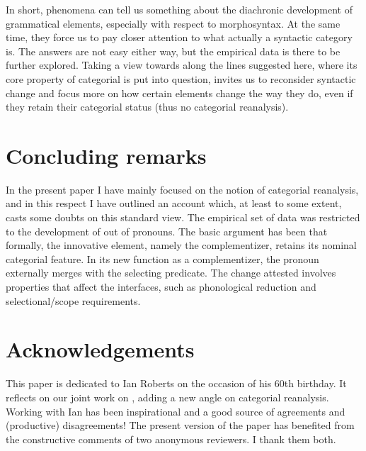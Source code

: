 \documentclass[output=paper]{langsci/langscibook}
\begin{document}
In short,  phenomena can tell us something about the
diachronic development of grammatical elements, especially with respect to
morphosyntax. At the same time, they force us to pay closer attention to what
actually a syntactic category is. The answers are not easy either way, but the
empirical data is there to be further explored. Taking a view towards
 along the lines suggested here, where its core property of
categorial  is put into question, invites us to reconsider syntactic
change and focus more on how certain elements change the way they do, even if
they retain their categorial status (thus no categorial reanalysis).

\section{Concluding remarks}\label{sec:21-conclusions}

In the present paper I have mainly focused on the notion of categorial
reanalysis, and in this respect I have outlined an account which, at least to
some extent, casts some doubts on this standard view. The empirical set of data
was restricted to the development of  out of pronouns. The
basic argument has been that formally, the innovative element, namely the
complementizer, retains its nominal categorial
feature. In its new function as a complementizer, the
pronoun externally merges with the selecting predicate.  The change attested
involves properties that affect the interfaces, such as phonological reduction
and selectional/scope requirements.

\label{sec:abbreviations}

\printchapterglossary{}

\section*{Acknowledgements}

This paper is dedicated to Ian Roberts on the occasion of his 60th birthday. It
reflects on our joint work on , adding a new angle on
categorial reanalysis. Working with Ian has been inspirational and a good
source of agreements and (productive) disagreements! The present version of the
paper has benefited from the constructive comments of two anonymous reviewers.
I thank them both.

{\sloppy\printbibliography[heading=subbibliography,notkeyword=this]}
\end{document}
